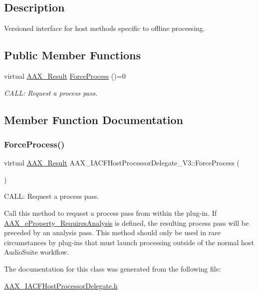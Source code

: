 \subsection{Description}
Versioned interface for host methods specific to offline processing. \subsection*{Public Member Functions}
\begin{DoxyCompactItemize}
\item 
virtual \mbox{\hyperlink{a00392_a4d8f69a697df7f70c3a8e9b8ee130d2f}{A\+A\+X\+\_\+\+Result}} \mbox{\hyperlink{a01709_a0da1cb9fc37e23f513e6890845b92b53}{Force\+Process}} ()=0
\begin{DoxyCompactList}\small\item\em C\+A\+LL\+: Request a process pass. \end{DoxyCompactList}\end{DoxyCompactItemize}


\subsection{Member Function Documentation}
\mbox{\label{a01709_a0da1cb9fc37e23f513e6890845b92b53}} 
\subsubsection{\texorpdfstring{ForceProcess()}{ForceProcess()}}
{\footnotesize\ttfamily virtual \mbox{\hyperlink{a00392_a4d8f69a697df7f70c3a8e9b8ee130d2f}{A\+A\+X\+\_\+\+Result}} A\+A\+X\+\_\+\+I\+A\+C\+F\+Host\+Processor\+Delegate\+\_\+\+V3\+::\+Force\+Process (\begin{DoxyParamCaption}{ }\end{DoxyParamCaption})\hspace{0.3cm}{\ttfamily [pure virtual]}}



C\+A\+LL\+: Request a process pass. 

Call this method to request a process pass from within the plug-\/in. If \mbox{\hyperlink{a00662_a13e384f22825afd3db6d68395b79ce0da925c49bb79454b33bf1d5f4cb09d373f}{A\+A\+X\+\_\+e\+Property\+\_\+\+Requires\+Analysis}} is defined, the resulting process pass will be preceded by an analysis pass. This method should only be used in rare circumstances by plug-\/ins that must launch processing outside of the normal host Audio\+Suite workflow. 

The documentation for this class was generated from the following file\+:\begin{DoxyCompactItemize}
\item 
\mbox{\hyperlink{a00539}{A\+A\+X\+\_\+\+I\+A\+C\+F\+Host\+Processor\+Delegate.\+h}}\end{DoxyCompactItemize}

